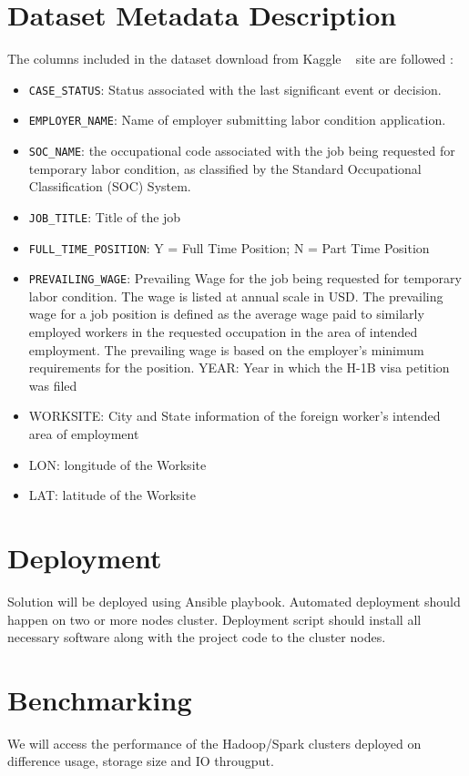\documentclass[9pt,twocolumn,twoside]{../../styles/osajnl}
\begin{document}
\section{Dataset Metadata Description}

The columns included in the dataset download from Kaggle ~\cite{www-kaggle} site  are followed  : 

\begin{itemize}
 \item  \verb|CASE_STATUS|: Status associated with the last significant event or decision.
 \item \verb|EMPLOYER_NAME|: Name of employer submitting labor condition application.
 \item  \verb|SOC_NAME|: the occupational code associated with the job being requested for temporary labor condition, as classified by the Standard Occupational Classification (SOC) System.
 \item  \verb|JOB_TITLE|: Title of the job
 \item  \verb|FULL_TIME_POSITION|: Y = Full Time Position; N = Part Time Position
 \item  \verb|PREVAILING_WAGE|: Prevailing Wage for the job being requested for temporary labor condition. The wage is listed at annual scale in USD. The prevailing wage for a job position is defined as the average wage paid to similarly employed workers in the requested occupation in the area of intended employment. The prevailing wage is based on the employer’s minimum requirements for the position. 
 YEAR: Year in which the H-1B visa petition was filed
 \item  WORKSITE: City and State information of the foreign worker's intended area of employment
 \item  LON: longitude of the Worksite
 \item  LAT: latitude of the Worksite
\end{itemize}

\section{Deployment}
Solution will be deployed using Ansible \cite{wiki-ansible} playbook. Automated deployment should happen on two or more nodes cluster. Deployment script should install all necessary software along with the project code to the cluster nodes.

\section{Benchmarking}
We will access the performance of the Hadoop/Spark clusters deployed on difference usage, storage size and IO througput. 
\end{document}
